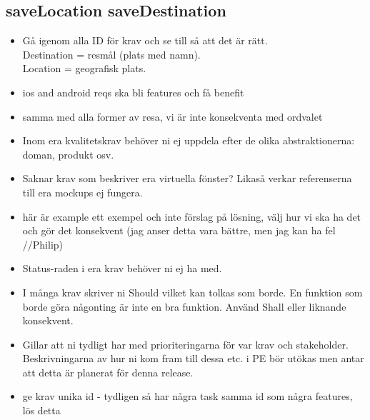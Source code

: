 \documentclass[a4paper]{article}
\begin{document}
\subsection{saveLocation saveDestination}
		\begin{itemize}
			\item Gå igenom alla ID för krav och se till så att det är rätt.
			\\Destination = resmål (plats med namn).
			\\Location = geografisk plats.
		\end{itemize}
	\begin{itemize}	
	\item ios and android reqs ska bli features och få benefit
	\item samma med alla former av resa, vi är inte konsekventa med ordvalet
	\item Inom era kvalitetskrav behöver ni ej uppdela efter de olika abstraktionerna: doman, produkt osv.
	\item Saknar krav som beskriver era virtuella fönster? Likaså verkar referenserna till era mockups ej fungera.
	
	\item här är example ett exempel och inte förslag på lösning, välj hur vi ska ha det och gör det konsekvent (jag anser detta vara bättre, men jag kan ha fel //Philip)
	
	\item Status-raden i era krav behöver ni ej ha med.
	\item I många krav skriver ni Should vilket kan tolkas som borde. En funktion som borde göra någonting är inte en bra funktion. Använd Shall eller liknande konsekvent. 
	\item Gillar att ni tydligt har med prioriteringarna för var krav och stakeholder. Beskrivningarna av hur ni kom fram till dessa etc. i PE bör utökas men antar att detta är planerat för denna release.
	\item ge krav unika id - tydligen så har några task samma id som några features, lös detta
	\end{itemize}
\end{document}
